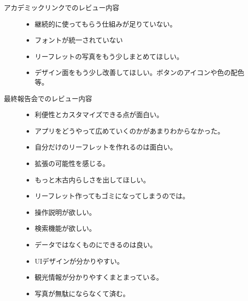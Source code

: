 \begin{description}
\item[アカデミックリンクでのレビュー内容]\mbox{}
 \begin{itemize}
 \item 継続的に使ってもらう仕組みが足りていない。
 \item フォントが統一されていない
 \item リーフレットの写真をもう少しまとめてほしい。
 \item デザイン面をもう少し改善してほしい。ボタンのアイコンや色の配色等。
 \end{itemize}
\item[最終報告会でのレビュー内容]\mbox{}
 \begin{itemize}
 \item 利便性とカスタマイズできる点が面白い。
 \item アプリをどうやって広めていくのかがあまりわからなかった。
 \item 自分だけのリーフレットを作れるのは面白い。
 \item 拡張の可能性を感じる。
 \item もっと木古内らしさを出してほしい。
 \item リーフレット作ってもゴミになってしまうのでは。
 \item 操作説明が欲しい。
 \item 検索機能が欲しい。
 \item データではなくものにできるのは良い。
 \item UIデザインが分かりやすい。
 \item 観光情報が分かりやすくまとまっている。
 \item 写真が無駄にならなくて済む。
 \end{itemize}
\end{description}

